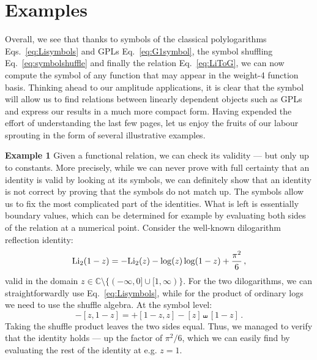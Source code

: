 \documentclass[main.tex]{subfiles}
\begin{document}
\section{Examples}
Overall, we see that thanks to symbols of the classical polylogarithms Eqs.~\ref{eq:Lisymbols} and GPLs Eq.~\ref{eq:G1symbol}, the symbol shuffling Eq.~\ref{eq:symbolshuffle} and finally the relation Eq.~\ref{eq:LiToG}, we can now compute the symbol of any function that may appear in the weight-4 function basis. Thinking ahead to our amplitude applications, it is clear that the symbol will allow us to find relations between linearly dependent objects such as GPLs and express our results in a much more compact form. Having expended the effort of understanding the last few pages, let us enjoy the fruits of our labour sprouting in the form of several illustrative examples.

\textbf{Example 1} \newline
Given a functional relation, we can check its validity --- but only up to constants. More precisely, while we can never prove with full certainty that an identity is valid by looking at its symbols, we can definitely show that an identity is not correct by proving that the symbols do not match up. The symbols allow us to fix the most complicated part of the identities. What is left is essentially boundary values, which can be determined for example by evaluating both sides of the relation at a numerical point. Consider the well-known dilogarithm reflection identity:
\begin{equation}
    \text{Li}_2(1-z) =- \text{Li}_2(z) -\log(z) \log(1-z) + \frac{\pi^2}{6} \,,
\end{equation}
valid in the domain $z \in \mathbb{C} \setminus\{(-\infty, 0] \cup [1, \infty)\}$. For the two dilogarithms, we can straightforwardly use Eq.~\ref{eq:Lisymbols}, while for the product of ordinary logs we need to use the shuffle algebra. At the symbol level:
\begin{equation}
    -[z,1-z] = + [1-z,z] - [z] \shuffle [1-z]\,.
\end{equation}
Taking the shuffle product leaves the two sides equal. Thus, we managed to verify that the identity holds --- up the factor of $\pi^2/6$, which we can easily find by evaluating the rest of the identity at e.g. $z=1$.
\end{document}
